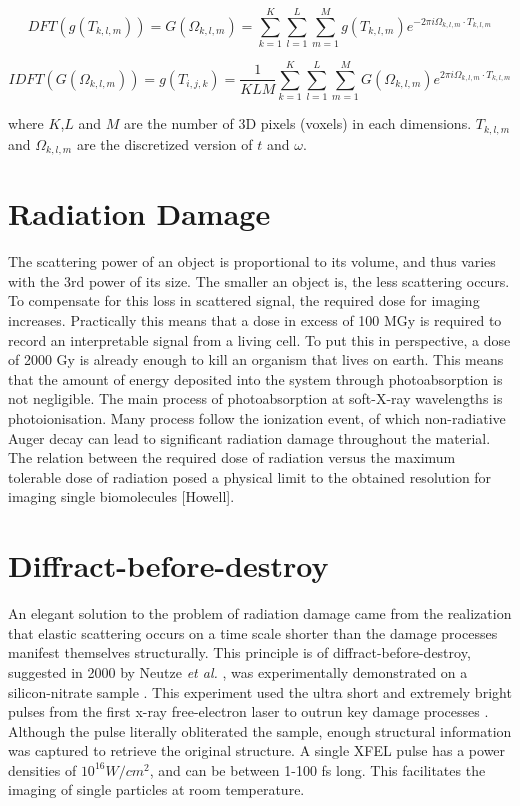 \begin{enumerate}
\begin{equation}
DFT( g( T_{k,l,m} ) ) = G( \Omega_{k,l,m} ) = \sum_{k=1}^{K} \sum_{l=1}^{L} \sum_{m=1}^{M} g( T_{k,l,m} ) e^{-2 \pi i \Omega_{k,l,m} \cdot T_{k,l,m}}
\end{equation}

\begin{equation}
IDFT( G( \Omega_{k,l,m} ) ) = g ( T_{i,j,k} ) = \frac{1}{{K L M}} \sum_{k=1}^{K} \sum_{l=1}^{L}\sum_{m=1}^{M} G( \Omega_{k,l,m} ) e^{2 \pi i \Omega_{k,l,m} \cdot T_{k,l,m} }
\end{equation}

where $K$,$L$ and $M$ are the number of 3D pixels (voxels) in each dimensions. $T_{k,l,m}$ and $\Omega_{k,l,m}$ are the discretized version of $t$ and $\omega$. 

\end{enumerate}

\section{Radiation Damage}
The scattering power of an object is proportional to its volume, and thus varies with the 3rd power of its size. The smaller an object is, the less scattering occurs. To compensate for this loss in scattered signal, the required dose for imaging increases. Practically this means that a dose in excess of 100 MGy is required to record an interpretable signal from a living cell. To put this in perspective, a dose of 2000 Gy is already enough to kill an organism that lives on earth. This means that the amount of energy deposited into the system through photoabsorption is not negligible. The main process of photoabsorption at soft-X-ray wavelengths is  photoionisation. Many process follow the ionization event, of which non-radiative Auger decay can lead to significant radiation damage throughout the material. The relation between the required dose of radiation versus the maximum tolerable dose of radiation posed a physical limit to the obtained resolution for imaging single biomolecules [Howell].

\section{Diffract-before-destroy}
An elegant solution to the problem of radiation damage came from the realization that elastic scattering occurs on a  time scale shorter than the damage processes manifest themselves structurally. This principle is of diffract-before-destroy, suggested in 2000 by Neutze \textit{et al.} \cite{Neutze2000}, was experimentally demonstrated on a silicon-nitrate sample \cite{Chapman2009}. This experiment used the ultra short and extremely bright pulses from the first x-ray free-electron laser to outrun key damage processes \cite{Chapman2000}. Although the pulse literally obliterated the sample, enough structural information was captured to retrieve the original structure. A single XFEL pulse has a power densities of $10^{16} W/cm^2$, and can be between 1-100 fs long. This facilitates the imaging of single particles at room temperature.

